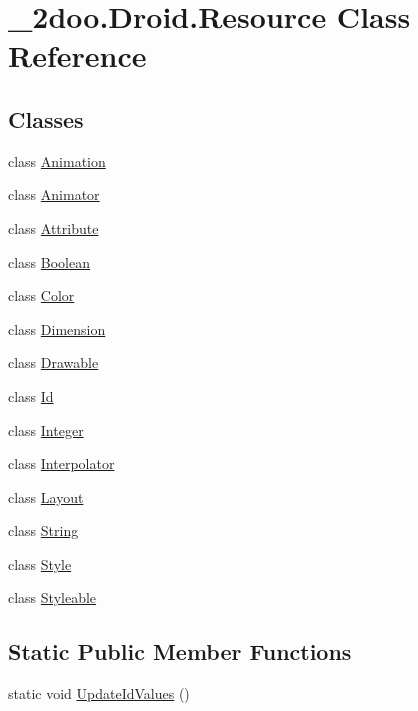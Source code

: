\hypertarget{class__2doo_1_1_droid_1_1_resource}{
\section{\_\-2doo.Droid.Resource Class Reference}
\label{class__2doo_1_1_droid_1_1_resource}
}
\subsection*{Classes}
\begin{CompactItemize}
\item 
class \hyperlink{class__2doo_1_1_droid_1_1_resource_1_1_animation}{Animation}
\item 
class \hyperlink{class__2doo_1_1_droid_1_1_resource_1_1_animator}{Animator}
\item 
class \hyperlink{class__2doo_1_1_droid_1_1_resource_1_1_attribute}{Attribute}
\item 
class \hyperlink{class__2doo_1_1_droid_1_1_resource_1_1_boolean}{Boolean}
\item 
class \hyperlink{class__2doo_1_1_droid_1_1_resource_1_1_color}{Color}
\item 
class \hyperlink{class__2doo_1_1_droid_1_1_resource_1_1_dimension}{Dimension}
\item 
class \hyperlink{class__2doo_1_1_droid_1_1_resource_1_1_drawable}{Drawable}
\item 
class \hyperlink{class__2doo_1_1_droid_1_1_resource_1_1_id}{Id}
\item 
class \hyperlink{class__2doo_1_1_droid_1_1_resource_1_1_integer}{Integer}
\item 
class \hyperlink{class__2doo_1_1_droid_1_1_resource_1_1_interpolator}{Interpolator}
\item 
class \hyperlink{class__2doo_1_1_droid_1_1_resource_1_1_layout}{Layout}
\item 
class \hyperlink{class__2doo_1_1_droid_1_1_resource_1_1_string}{String}
\item 
class \hyperlink{class__2doo_1_1_droid_1_1_resource_1_1_style}{Style}
\item 
class \hyperlink{class__2doo_1_1_droid_1_1_resource_1_1_styleable}{Styleable}
\end{CompactItemize}
\subsection*{Static Public Member Functions}
\begin{CompactItemize}
\item 
static void \hyperlink{class__2doo_1_1_droid_1_1_resource_a98f33d59d19997d6c4bce90bf69b92d}{UpdateIdValues} ()
\end{CompactItemize}
